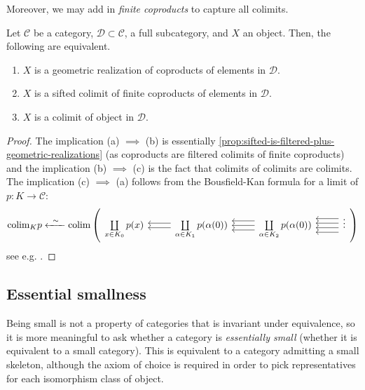 Moreover, we may add in \emph{finite coproducts} to capture all colimits.
\def\cC{\mathcal{C}}
\def\cD{\mathcal{D}}
\begin{proposition}\label{prop:colimit-is-sifted-plus-finite-coproducts}
  Let $\cC$ be a category, $\cD \subset \cC$, a full subcategory, and $X$ an object.
  Then, the following are equivalent.
  \begin{enumerate}[label={(\alph*)}]
    \item $X$ is a geometric realization of coproducts of elements in $\cD$.
    \item $X$ is a sifted colimit of finite coproducts of elements in $\cD$.
    \item $X$ is a colimit of object in $\cD$.
  \end{enumerate}
\end{proposition}
\begin{proof}
  The implication (a) $\implies$ (b) is essentially \autoref{prop:sifted-is-filtered-plus-geometric-realizations} (as coproducts are filtered colimits of finite coproducts) and the implication (b) $\implies$ (c) is the fact that colimits of colimits are colimits.
  The implication (c) $\implies$ (a) follows from the Bousfield-Kan formula for a limit of $p\colon K \rightarrow \cC$:
  \[
    \colim_K p \xleftarrow{\;\;\sim\;\;} \colim \left(
\begin{tikzcd}
	{\coprod\limits_{x \in K_0} p(x)} & {\coprod\limits_{\alpha \in K_1} p(\alpha(0))} & {\coprod\limits_{\alpha \in K_2} p(\alpha(0))} & \vdots
	\arrow[shift left, from=1-2, to=1-1]
	\arrow[shift right, from=1-2, to=1-1]
	\arrow[from=1-3, to=1-2]
	\arrow[shift right=2, from=1-3, to=1-2]
	\arrow[shift left=2, from=1-3, to=1-2]
	\arrow[shift left, from=1-4, to=1-3]
	\arrow[shift right, from=1-4, to=1-3]
	\arrow[shift left=3, from=1-4, to=1-3]
	\arrow[shift right=3, from=1-4, to=1-3]
\end{tikzcd}
    \right)
  \] 
  see e.g. \cite[Cor~12.5]{Shah-parametrized}.
\end{proof}
\subsection{Essential smallness}

Being small is not a property of categories that is invariant under equivalence, so it is more meaningful to ask whether a category is \textit{essentially small} (whether it is equivalent to a small category). This is equivalent to a category admitting a small skeleton, although the axiom of choice is required in order to pick representatives for each isomorphism class of object.

